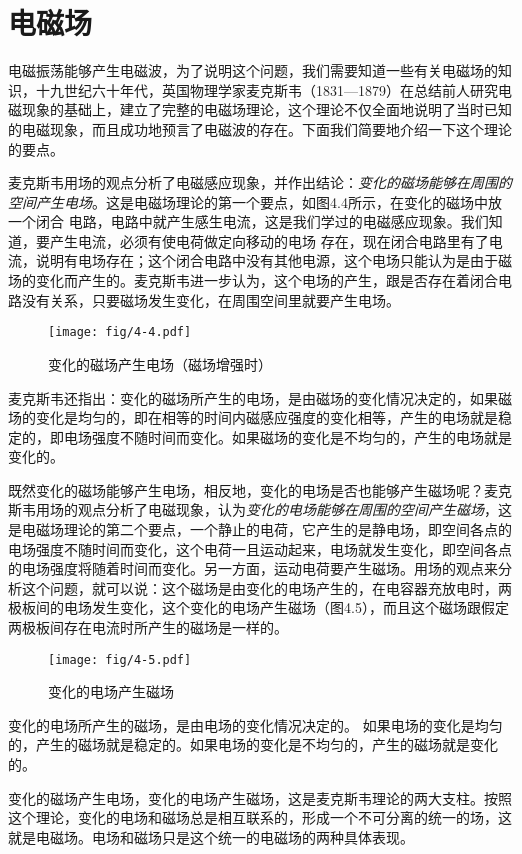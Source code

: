\section{电磁场}

电磁振荡能够产生电磁波，为了说明这个问题，我们需要知道一些有关电磁场的知识，十九世纪六十年代，英国物理学家麦克斯韦（1831—1879）在总结前人研究电磁现象的基础上，建立了完整的电磁场理论，这个理论不仅全面地说明了当时已知的电磁现象，而且成功地预言了电磁波的存在。下面我们简要地介绍一下这个理论的要点。

麦克斯韦用场的观点分析了电磁感应现象，并作出结论：\textit{变化的磁场能够在周围的空间产生电场}。这是电磁场理论的第一个要点，如图4.4所示，在变化的磁场中放一个闭合
电路，电路中就产生感生电流，这是我们学过的电磁感应现象。我们知道，要产生电流，必须有使电荷做定向移动的电场
存在，现在闭合电路里有了电流，说明有电场存在；这个闭合电路中没有其他电源，这个电场只能认为是由于磁场的变化而产生的。麦克斯韦进一步认为，这个电场的产生，跟是否存在着闭合电路没有关系，只要磁场发生变化，在周围空间里就要产生电场。
\begin{figure}[htp]\centering
\texttt{[image: fig/4-4.pdf]}
\caption{变化的磁场产生电场（磁场增强时）}
\end{figure}

麦克斯韦还指出：变化的磁场所产生的电场，是由磁场的变化情况决定的，如果磁场的变化是均匀的，即在相等的时间内磁感应强度的变化相等，产生的电场就是稳定的，即电场强度不随时间而变化。如果磁场的变化是不均匀的，产生的电场就是变化的。

既然变化的磁场能够产生电场，相反地，变化的电场是否也能够产生磁场呢？麦克斯韦用场的观点分析了电磁现象，认为\textit{变化的电场能够在周围的空间产生磁场}，这是电磁场理论的第二个要点，一个静止的电荷，它产生的是静电场，即空间各点的电场强度不随时间而变化，这个电荷一且运动起来，电场就发生变化，即空间各点的电场强度将随着时间而变化。另一方面，运动电荷要产生磁场。用场的观点来分析这个问题，就可以说：这个磁场是由变化的电场产生的，在电容器充放电时，两极板间的电场发生变化，这个变化的电场产生磁场（图4.5），而且这个磁场跟假定两极板间存在电流时所产生的磁场是一样的。
\begin{figure}[htp]\centering
\texttt{[image: fig/4-5.pdf]}
\caption{变化的电场产生磁场}
\end{figure}


变化的电场所产生的磁场，是由电场的变化情况决定的。
如果电场的变化是均匀的，产生的磁场就是稳定的。如果电场的变化是不均匀的，产生的磁场就是变化的。

变化的磁场产生电场，变化的电场产生磁场，这是麦克斯韦理论的两大支柱。按照这个理论，变化的电场和磁场总是相互联系的，形成一个不可分离的统一的场，这就是电磁场。电场和磁场只是这个统一的电磁场的两种具体表现。

